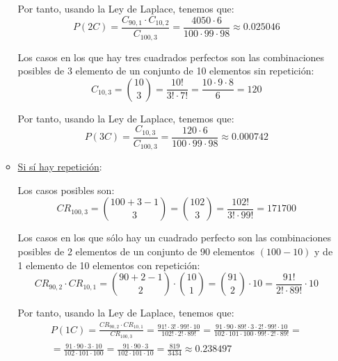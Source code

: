 \begin{ejercicio}
\begin{enumerate}
\begin{itemize}
            Por tanto, usando la Ley de Laplace, tenemos que:
            \begin{equation*}
                P(2C)=\frac{C_{90,1}\cdot C_{10,2}}{C_{100,3}}=\frac{4050\cdot 6}{100 \cdot 99 \cdot 98}
                \approx 0.025046
            \end{equation*}


            Los casos en los que hay tres cuadrados perfectos son las combinaciones posibles de 3 elemento de un conjunto de 10 elementos sin repetición:
            \begin{equation*}
                C_{10,3}=\binom{10}{3}=\frac{10!}{3!\cdot 7!} = \frac{10\cdot 9\cdot 8}{6}=120
            \end{equation*}

            Por tanto, usando la Ley de Laplace, tenemos que:
            \begin{equation*}
                P(3C)=\frac{C_{10,3}}{C_{100,3}}=\frac{120\cdot 6}{100 \cdot 99 \cdot 98}
                \approx 0.000742
            \end{equation*}



            \item \underline{Si sí hay repetición}:

            Los casos posibles son:
            \begin{equation*}
                CR_{100,3}=\binom{100+3-1}{3}=\binom{102}{3}=\frac{102!}{3!\cdot 99!} = 171700
            \end{equation*}

            Los casos en los que sólo hay un cuadrado perfecto son las combinaciones posibles de 2 elementos de un conjunto de 90 elementos $(100-10)$ y de 1 elemento de 10 elementos con repetición:
            \begin{equation*}
                CR_{90,2}\cdot CR_{10,1}=\binom{90+2-1}{2}\cdot \binom{10}{1}=\binom{91}{2}\cdot 10=\frac{91!}{2!\cdot 89!}\cdot 10
            \end{equation*}

            Por tanto, usando la Ley de Laplace, tenemos que:
            \begin{multline*}
                P(1C)=\frac{CR_{90,2}\cdot CR_{10,1}}{CR_{100,3}}=\frac{91!\cdot 3!\cdot 99!\cdot 10}{102!\cdot 2!\cdot 89!}
                =\frac{91\cdot 90\cdot 89!\cdot 3\cdot 2!\cdot 99!\cdot 10}{102\cdot 101\cdot 100 \cdot 99!\cdot 2!\cdot 89!}
                =\\=
                \frac{91\cdot 90\cdot 3\cdot 10}{102\cdot 101\cdot 100} =
                \frac{91\cdot 90\cdot 3}{102\cdot 101\cdot 10} =\frac{819}{3434} \approx 0.238497
            \end{multline*}




\end{itemize}
\end{enumerate}
\end{ejercicio}
